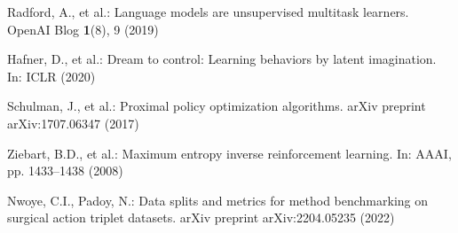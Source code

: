 \documentclass[runningheads]{llncs}
\begin{document}
\begin{thebibliography}{20}
Radford, A., et al.: Language models are unsupervised multitask learners. OpenAI Blog \textbf{1}(8), 9 (2019)

Hafner, D., et al.: Dream to control: Learning behaviors by latent imagination. In: ICLR (2020)

Schulman, J., et al.: Proximal policy optimization algorithms. arXiv preprint arXiv:1707.06347 (2017)

Ziebart, B.D., et al.: Maximum entropy inverse reinforcement learning. In: AAAI, pp. 1433--1438 (2008)

Nwoye, C.I., Padoy, N.: Data splits and metrics for method benchmarking on surgical action triplet datasets. arXiv preprint arXiv:2204.05235 (2022)
\end{thebibliography}
\end{document}
